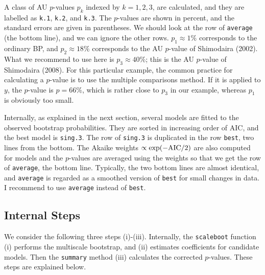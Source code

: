 \documentclass[a4paper]{amsart}
\begin{document}
A class of AU $p$-values $p_k$ indexed by $k=1,2,3$, are calculated,
and they are labelled as {\tt k.1}, {\tt k.2}, and {\tt k.3}.  The
$p$-values are shown in percent, and the standard errors are given in
parentheses.  We should look at the row of {\tt average} (the bottom
line), and we can ignore the other rows.  $p_1\approx 1\%$ corresponds
to the ordinary BP, and $p_2\approx 18\%$ corresponds to the AU
$p$-value of Shimodaira (2002).  What we recommend to use here is
$p_3\approx40\%$; this is the AU $p$-value of Shimodaira (2008).  For
this particular example, the common practice for calculating a
$p$-value is to use the multiple comparisons method. If it is applied
to $y$, the $p$-value is $p=66\%$, which is rather close to $p_3$ in
our example, whereas $p_1$ is obviously too small.

Internally, as explained in the next section, several models are
fitted to the observed bootstrap probabilities. They are sorted in
increasing order of AIC, and the best model is {\tt sing.3}. The row
of {\tt sing.3} is duplicated in the row {\tt best}, two lines from
the bottom. The Akaike weights $\propto \exp(-{\rm AIC}/2)$ are also
computed for models and the $p$-values are averaged using the weights
so that we get the row of {\tt average}, the bottom line. Typically,
the two bottom lines are almost identical, and {\tt average} is
regarded as a smoothed version of {\tt best} for small changes in
data.  I recommend to use {\tt average} instead of {\tt best}.

\subsection{Internal Steps}

We consider the following three steps (i)-(iii).
Internally, the {\tt scaleboot} function (i) performs the multiscale
bootstrap, and (ii) estimates coefficients for candidate models. Then
the {\tt summary} method (iii) calculates the corrected $p$-values.
These steps are explained below.
\end{document}
